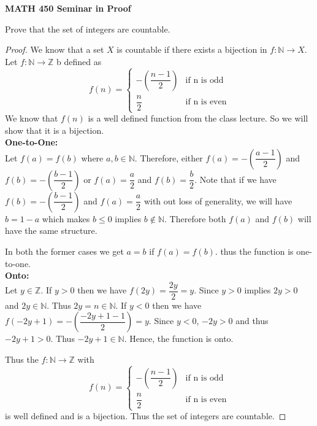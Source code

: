 \documentclass[14pt]{article}
\newcommand{\Z}{\mathbb Z}
\newcommand{\N}{\mathbb N}
\begin{document}
\begin{center}
		
{\bf MATH 450 Seminar in Proof}
 \\
\end{center}
	Prove that the set of integers are countable.
\begin{proof}
	 We know that a set $X$ is countable if there exists a bijection in $f: \N \rightarrow X$.
	 Let $f: \N \rightarrow \Z$ b defined as \[
f(n) =
\begin{cases}
 - \left( \dfrac{n-1}{2} \right) & \text{if n is odd} \\
 \dfrac{n}{2} & \text{if n is even}
\end{cases}
\]
We know that $f(n)$ is a well defined function from the class lecture. So we will show that it is a bijection. \\ 
\textbf{One-to-One: \\}
Let $f(a) = f(b)$ where $a,b \in \N$. Therefore, either $f(a) = - \left( \dfrac{a-1}{2} \right)$ and $f(b) = - \left( \dfrac{b-1}{2} \right)$ or $f(a) = \dfrac{a}{2}$ and $f(b) = \dfrac{b}{2}$. 
Note that if we have $f(b) = - \left( \dfrac{b-1}{2} \right)$ and $f(a) = \dfrac{a}{2}$ with out loss of generality, we will have $b = 1 - a$ which makes $b \leq 0$ implies $b \notin \N$. Therefore both $f(a)$ and $f(b)$ will have the same structure.


In both the former cases we get $a=b$ if $f(a) = f(b)$. thus the function is one-to-one.\\
\textbf{Onto: \\}
Let $y \in \Z$. If $y > 0$ then we have $f(2y) = \dfrac{2y}{2} = y$. Since $y > 0$ implies $2y >0$ and $2y \in \N$. 
 Thus $2y = n \in \N$. If $y < 0$ then we have $ f(-2y + 1) = - \left( \dfrac{-2y + 1-1}{2} \right) = y$. Since $y <0$, $-2y > 0$ and thus $-2y + 1 > 0$. Thus $-2y+1 \in \N$. Hence, the function is onto.

Thus the $f:\N \rightarrow \Z$ with \[
f(n) =
\begin{cases}
 - \left( \dfrac{n-1}{2} \right) & \text{if n is odd} \\
 \dfrac{n}{2} & \text{if n is even}
\end{cases}
\] is well defined and is a bijection. Thus the set of integers are countable.
\end{proof}
\end{document}
